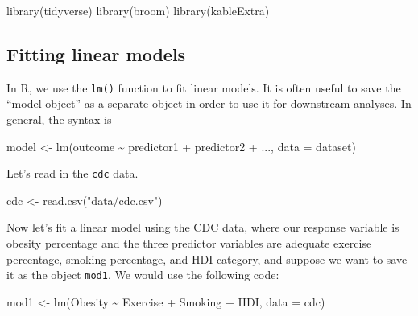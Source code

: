 \documentclass[
  letterpaper,
  DIV=11,
  numbers=noendperiod]{scrartcl}
\newenvironment{Shaded}{\begin{snugshade}}{\end{snugshade}}
\newcommand{\AttributeTok}[1]{\textcolor[rgb]{0.40,0.45,0.13}{#1}}
\newcommand{\FunctionTok}[1]{\textcolor[rgb]{0.28,0.35,0.67}{#1}}
\newcommand{\NormalTok}[1]{\textcolor[rgb]{0.00,0.23,0.31}{#1}}
\newcommand{\OtherTok}[1]{\textcolor[rgb]{0.00,0.23,0.31}{#1}}
\newcommand{\SpecialCharTok}[1]{\textcolor[rgb]{0.37,0.37,0.37}{#1}}
\newcommand{\StringTok}[1]{\textcolor[rgb]{0.13,0.47,0.30}{#1}}
\begin{document}
\begin{Shaded}
\begin{Highlighting}[]
\FunctionTok{library}\NormalTok{(tidyverse)}
\FunctionTok{library}\NormalTok{(broom)}
\FunctionTok{library}\NormalTok{(kableExtra)}
\end{Highlighting}
\end{Shaded}

\subsection{Fitting linear models}\label{fitting-linear-models}

In R, we use the \texttt{lm()} function to fit linear models. It is
often useful to save the ``model object'' as a separate object in order
to use it for downstream analyses. In general, the syntax is

\begin{Shaded}
\begin{Highlighting}[]
\NormalTok{model }\OtherTok{\textless{}{-}} \FunctionTok{lm}\NormalTok{(outcome }\SpecialCharTok{\textasciitilde{}}\NormalTok{ predictor1 }\SpecialCharTok{+}\NormalTok{ predictor2 }\SpecialCharTok{+}\NormalTok{ ..., }\AttributeTok{data =}\NormalTok{ dataset)}
\end{Highlighting}
\end{Shaded}

Let's read in the \texttt{cdc} data.

\begin{Shaded}
\begin{Highlighting}[]
\NormalTok{cdc }\OtherTok{\textless{}{-}} \FunctionTok{read.csv}\NormalTok{(}\StringTok{"data/cdc.csv"}\NormalTok{)}
\end{Highlighting}
\end{Shaded}

Now let's fit a linear model using the CDC data, where our response
variable is obesity percentage and the three predictor variables are
adequate exercise percentage, smoking percentage, and HDI category, and
suppose we want to save it as the object \texttt{mod1}. We would use the
following code:

\begin{Shaded}
\begin{Highlighting}[]
\NormalTok{mod1 }\OtherTok{\textless{}{-}} \FunctionTok{lm}\NormalTok{(Obesity }\SpecialCharTok{\textasciitilde{}}\NormalTok{ Exercise }\SpecialCharTok{+}\NormalTok{ Smoking }\SpecialCharTok{+}\NormalTok{ HDI, }\AttributeTok{data =}\NormalTok{ cdc)}
\end{Highlighting}
\end{Shaded}
\end{document}
